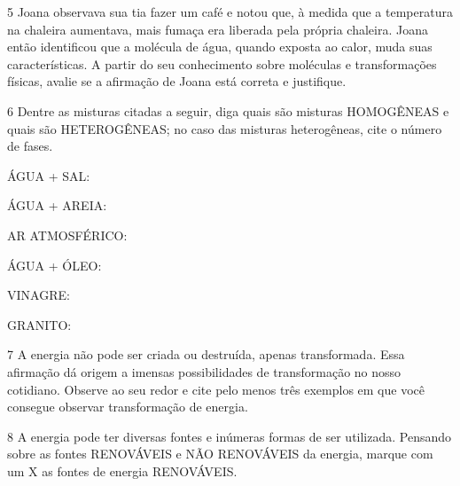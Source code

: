 {

\num{5} Joana observava sua tia fazer um café e notou que, à medida que a temperatura na chaleira aumentava, mais fumaça era liberada pela própria chaleira. Joana então identificou que a molécula de água, quando exposta ao calor, muda suas características. A partir do seu conhecimento sobre moléculas e transformações físicas, avalie se a afirmação de Joana está correta e justifique.
  


\num{6} Dentre as misturas citadas a
  seguir, diga quais são misturas HOMOGÊNEAS e quais são HETEROGÊNEAS; no caso das
  misturas heterogêneas, cite o número de fases.

\begin{escolha}
\item
  ÁGUA + SAL: 
\item
  ÁGUA + AREIA: 
\item
  AR ATMOSFÉRICO: 
\item
  ÁGUA + ÓLEO: 
\item
  VINAGRE: 
\item
  GRANITO: 
\end{escolha}

\num{7}  A energia não pode ser criada ou destruída, apenas transformada. Essa
  afirmação dá origem a imensas possibilidades de transformação no nosso
  cotidiano. Observe ao seu redor e cite pelo menos três exemplos em que
  você consegue observar transformação de energia.



\num{8} A energia pode ter diversas fontes e inúmeras formas de ser utilizada. Pensando sobre as fontes RENOVÁVEIS e NÃO RENOVÁVEIS da energia, marque com um X as fontes de energia RENOVÁVEIS.

}
